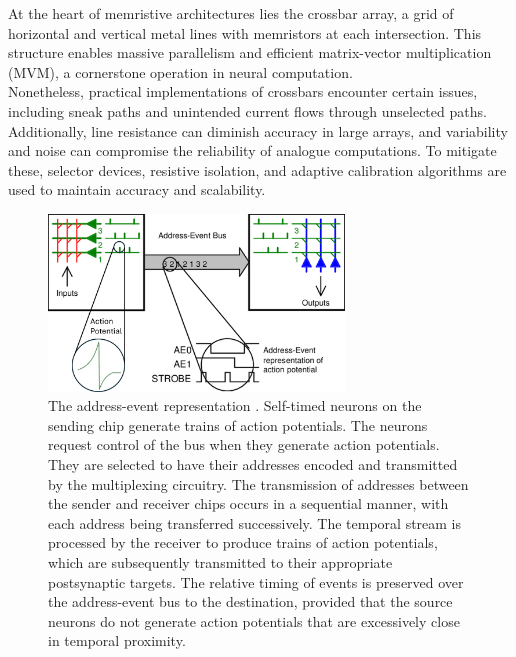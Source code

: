 At the heart of memristive architectures lies the crossbar array, a grid of horizontal and vertical metal lines with memristors at each intersection. This structure enables massive parallelism and efficient matrix-vector multiplication (MVM), a cornerstone operation in neural computation. \\

\noindent Nonetheless, practical implementations of crossbars encounter certain issues, including sneak paths and unintended current flows through unselected paths. Additionally, line resistance can diminish accuracy in large arrays, and variability and noise can compromise the reliability of analogue computations. To mitigate these, selector devices, resistive isolation, and adaptive calibration algorithms are used to maintain accuracy and scalability.\\

\begin{figure}[htbp!] 
    \centering    
    \includegraphics[width=0.7\textwidth]{Chapter2/Figs/i.png}
    \caption[The address-event representation.]{The address-event representation \cite{deiss1999pulse}. Self-timed neurons on the sending chip generate trains of action potentials. The neurons request control of the bus when they generate action potentials. They are selected to have their addresses encoded and transmitted by the multiplexing circuitry. The transmission of addresses between the sender and receiver chips occurs in a sequential manner, with each address being transferred successively. The temporal stream is processed by the receiver to produce trains of action potentials, which are subsequently transmitted to their appropriate postsynaptic targets. The relative timing of events is preserved over the address-event bus to the destination, provided that the source neurons do not generate action potentials that are excessively close in temporal proximity.}
    \label{fig:2i}
\end{figure}
    

